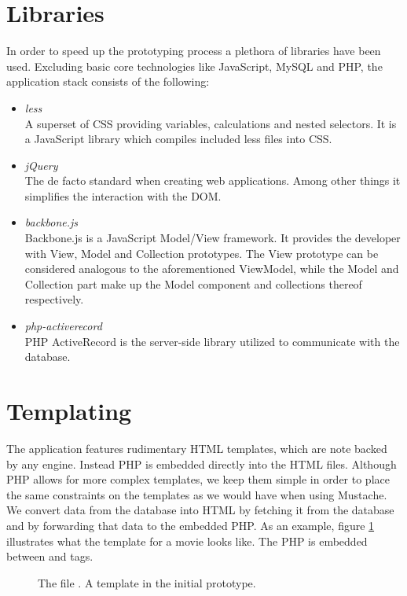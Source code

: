\section{Libraries}
In order to speed up the prototyping process a plethora of libraries have been
used. Excluding basic core technologies like JavaScript, MySQL and PHP, the
application stack consists of the following:
\begin{itemize}
	\item \emph{less}\\
	A superset of CSS providing variables, calculations and nested selectors. It
	is a JavaScript library which compiles included less files into CSS.
	\item \emph{jQuery}\\
	The de facto standard when creating web applications. Among other things it
	simplifies the interaction with the DOM.
	\item \emph{backbone.js}\\
	Backbone.js is a JavaScript Model/View framework. It provides the developer
	with View, Model and Collection prototypes. The View prototype can be
	considered analogous to the aforementioned ViewModel, while the Model and
	Collection part make up the Model component and collections thereof
	respectively.
	\item \emph{php-activerecord}\\
	PHP ActiveRecord is the server-side library utilized to communicate with the
	database.
\end{itemize}

\section{Templating}
The application features rudimentary HTML templates, which are note backed by
any engine. Instead PHP is embedded directly into the HTML files.
Although PHP allows for more complex templates, we keep them simple in order to
place the same constraints on the templates as we would have when using
Mustache.
We convert data from the database into HTML by fetching it from the database and
by forwarding that data to the embedded PHP.
As an example, figure \ref{fig:movie.view.tpl} illustrates what the template
for a movie looks like.
The PHP is embedded between  and  tags.

\begin{figure}
	\label{fig:movie.view.tpl}
	\centering
	
	\caption{
		The file .
		A template in the initial prototype.}
\end{figure}

